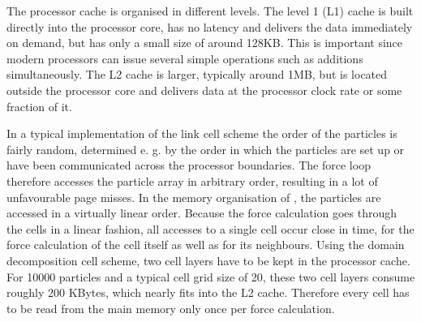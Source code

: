 The processor cache is organised in different levels. The level 1 (L1)
cache is built directly into the processor core, has no latency and
delivers the data immediately on demand, but has only a small size of
around 128KB. This is important since modern processors can issue
several simple operations such as additions simultaneously. The L2
cache is larger, typically around 1MB, but is located outside the
processor core and delivers data at the processor clock rate or some
fraction of it.

In a typical implementation of the link cell scheme the order of the
particles is fairly random, determined e. g. by the order in which the
particles are set up or have been communicated across the processor
boundaries. The force loop therefore accesses the particle array in
arbitrary order, resulting in a lot of unfavourable page misses. In
the memory organisation of \es{}, the particles are accessed in a
virtually linear order. Because the force calculation goes through the
cells in a linear fashion, all accesses to a single cell occur close
in time, for the force calculation of the cell itself as well as for
its neighbours. Using the domain decomposition cell scheme, two cell
layers have to be kept in the processor cache. For 10000 particles and
a typical cell grid size of 20, these two cell layers consume roughly
200 KBytes, which nearly fits into the L2 cache. Therefore every cell
has to be read from the main memory only once per force calculation.



